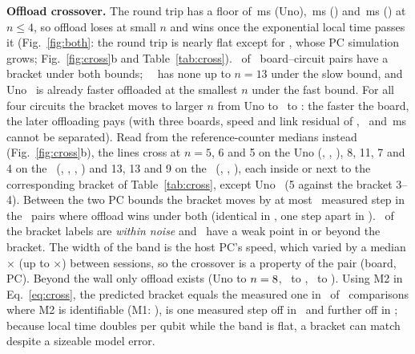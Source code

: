 \documentclass[conference,a4paper,10pt]{IEEEtran}
\begin{document}
\textbf{Offload crossover.} The round trip has a floor of \FloorMsUno\,ms (Uno), \FloorMsEspLo\,ms (\espA) and \FloorMsEspHi\,ms (\espB) at $n\le4$, so offload loses at small $n$ and wins once the exponential local time passes it (Fig.~\ref{fig:both}: the round trip is nearly flat except for \grover, whose PC simulation grows; Fig.~\ref{fig:cross}b and Table~\ref{tab:cross}). \CrossBoth\ of \NCross\ board--circuit pairs have a bracket under both bounds; \espB\ \hall\ has none up to $n=13$ under the slow bound, and Uno \grover\ is already faster offloaded at the smallest $n$ under the fast bound. For all four circuits the bracket moves to larger $n$ from Uno to \espA\ to \espB: the faster the board, the later offloading pays (with three boards, speed and link residual of \ResidBoardUno, \ResidBoardEspLo\ and \ResidBoardEspHi\,ms cannot be separated). Read from the reference-counter medians instead (Fig.~\ref{fig:cross}b), the lines cross at $n=5$, 6 and 5 on the Uno (\hall, \bell, \qft), 8, 11, 7 and 4 on the \espA\ (\hall, \bell, \qft, \grover) and 13, 13 and 9 on the \espB\ (\bell, \qft, \grover), each inside or next to the corresponding bracket of Table~\ref{tab:cross}, except Uno \qft\ (5 against the bracket 3--4). Between the two PC bounds the bracket moves by at most \ShiftMax\ measured step in the \ShiftN\ pairs where offload wins under both (identical in \ShiftSame, one step apart in \ShiftOne). \LabNoise\ of the bracket labels are \emph{within noise} and \LabWeak\ have a weak point in or beyond the bracket. The width of the band is the host PC's speed, which varied by a median \SimSpreadMed$\times$ (up to \SimSpreadMax$\times$) between sessions, so the crossover is a property of the pair (board, PC). Beyond the wall only offload exists (Uno to $n=8$, \espA\ to \OffNMaxEspLo, \espB\ to \OffNMaxEspHi). Using M2 in Eq.~\eqref{eq:cross}, the predicted bracket equals the measured one in \PredMatchTwo\ of \PredN\ comparisons where M2 is identifiable (M1: \PredMatchOne), is one measured step off in \PredOffOneTwo\ and further off in \PredOffMoreTwo; because local time doubles per qubit while the band is flat, a bracket can match despite a sizeable model error.
\end{document}
